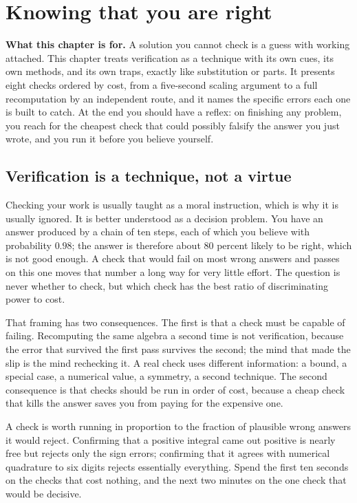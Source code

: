 \chapter{Knowing that you are right}

\begin{orient}
\textbf{What this chapter is for.} A solution you cannot check is a guess with working attached. This chapter treats verification as a technique with its own cues, its own methods, and its own traps, exactly like substitution or parts. It presents eight checks ordered by cost, from a five-second scaling argument to a full recomputation by an independent route, and it names the specific errors each one is built to catch. At the end you should have a reflex: on finishing any problem, you reach for the cheapest check that could possibly falsify the answer you just wrote, and you run it before you believe yourself.
\end{orient}

\section{Verification is a technique, not a virtue}

Checking your work is usually taught as a moral instruction, which is why it is usually ignored. It is better understood as a decision problem. You have an answer produced by a chain of ten steps, each of which you believe with probability $0.98$; the answer is therefore about $80$ percent likely to be right, which is not good enough. A check that would fail on most wrong answers and passes on this one moves that number a long way for very little effort. The question is never whether to check, but which check has the best ratio of discriminating power to cost.

That framing has two consequences. The first is that a check must be capable of failing. Recomputing the same algebra a second time is not verification, because the error that survived the first pass survives the second; the mind that made the slip is the mind rechecking it. A real check uses different information: a bound, a special case, a numerical value, a symmetry, a second technique. The second consequence is that checks should be run in order of cost, because a cheap check that kills the answer saves you from paying for the expensive one.

\begin{keynote}
A check is worth running in proportion to the fraction of plausible wrong answers it would reject. Confirming that a positive integral came out positive is nearly free but rejects only the sign errors; confirming that it agrees with numerical quadrature to six digits rejects essentially everything. Spend the first ten seconds on the checks that cost nothing, and the next two minutes on the one check that would be decisive.
\end{keynote}

